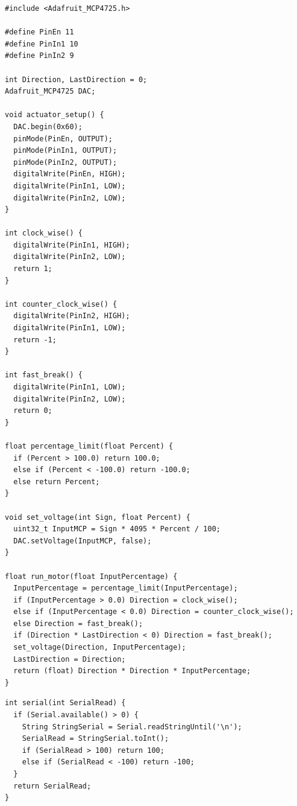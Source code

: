 \documentclass[11pt,a4paper]{article}
\begin{document}
\begin{lstlisting}[caption={Tab \texttt{2\_actuator.ino}},label={lst:actuator}]
#include <Adafruit_MCP4725.h>

#define PinEn 11
#define PinIn1 10
#define PinIn2 9

int Direction, LastDirection = 0;
Adafruit_MCP4725 DAC;

void actuator_setup() {
  DAC.begin(0x60);
  pinMode(PinEn, OUTPUT);
  pinMode(PinIn1, OUTPUT);
  pinMode(PinIn2, OUTPUT);
  digitalWrite(PinEn, HIGH);
  digitalWrite(PinIn1, LOW);
  digitalWrite(PinIn2, LOW);
}

int clock_wise() {
  digitalWrite(PinIn1, HIGH);
  digitalWrite(PinIn2, LOW);
  return 1;
}

int counter_clock_wise() {
  digitalWrite(PinIn2, HIGH);
  digitalWrite(PinIn1, LOW);
  return -1;
}

int fast_break() {
  digitalWrite(PinIn1, LOW);
  digitalWrite(PinIn2, LOW);
  return 0;
}

float percentage_limit(float Percent) {
  if (Percent > 100.0) return 100.0;
  else if (Percent < -100.0) return -100.0;
  else return Percent;
}

void set_voltage(int Sign, float Percent) {
  uint32_t InputMCP = Sign * 4095 * Percent / 100;
  DAC.setVoltage(InputMCP, false);
}

float run_motor(float InputPercentage) {
  InputPercentage = percentage_limit(InputPercentage);
  if (InputPercentage > 0.0) Direction = clock_wise();
  else if (InputPercentage < 0.0) Direction = counter_clock_wise();
  else Direction = fast_break();
  if (Direction * LastDirection < 0) Direction = fast_break();
  set_voltage(Direction, InputPercentage);
  LastDirection = Direction;
  return (float) Direction * Direction * InputPercentage;
}
\end{lstlisting}

\begin{lstlisting}[caption={Tab \texttt{3\_serial.ino}},label={lst:serial}]
int serial(int SerialRead) {
  if (Serial.available() > 0) {
    String StringSerial = Serial.readStringUntil('\n');
    SerialRead = StringSerial.toInt();
    if (SerialRead > 100) return 100;
    else if (SerialRead < -100) return -100;
  }
  return SerialRead;
}
\end{lstlisting}
\end{document}
